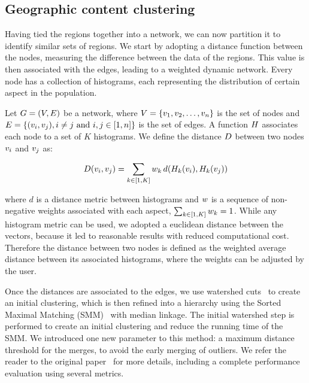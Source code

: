 \subsection{Geographic content clustering}
Having tied the regions together into a network, we can now partition it to
identify similar sets of regions. We start by adopting a distance function
between the nodes, measuring the difference between the data of the regions.
This value is then associated with the edges, leading to a weighted dynamic
network. Every node has a collection of histograms, each representing the
distribution of certain aspect in the population.

Let $G=(V,E)$ be a network, where
$V=\{v_1,v_2,\dots,v_n\}$ is the set of nodes and
$E=\{(v_i,v_j), i\not=j\text{ and }i,j \in [1,n]\}$ is the set of
edges. A function $H$ associates each node to a set of $K$ histograms. We
define the distance $D$ between two nodes $v_i$ and $v_j$ as:

\begin{equation}
    D(v_i,v_j)=\sum_{k \in [1,K]}{w_k\, d(H_k(v_i),H_k(v_j))}
    \label{eq:dist}
\end{equation}

\noindent where $d$ is a distance metric between histograms and $w$ is a
sequence of non-negative weights associated with each aspect,
$\sum_{k\in[1,K]}{w_k}=1$. While any histogram metric can be used, we
adopted a euclidean distance between the vectors, because it led to reasonable
results with reduced computational cost. Therefore the distance between two
nodes is defined as the weighted average distance between its associated
histograms, where the weights can be adjusted by the user.

Once the distances are associated to the edges, we use watershed
cuts~\citep{Cousty2009} to create an initial clustering, which is then refined
into a hierarchy using the Sorted Maximal Matching (SMM)~\citep{markus2017} with
median linkage. The initial watershed step is performed to create an initial
clustering and reduce the running time of the SMM. We introduced one new
parameter to this method: a maximum distance threshold for the merges, to avoid
the early merging of outliers. We refer the reader to the original
paper~\citep{markus2017} for more details, including a complete performance
evaluation using several metrics. 


